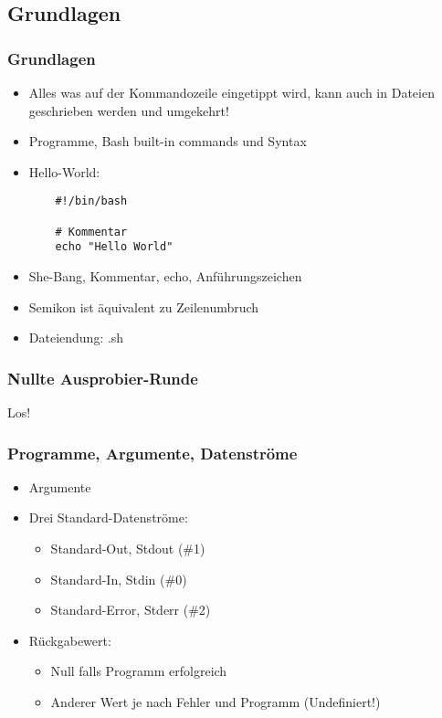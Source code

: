 \documentclass{beamer}
\begin{document}
\subsection{Grundlagen}
\begin{frame}[fragile,label=code]
 \frametitle{Grundlagen}
 
 \begin{itemize}
  \item Alles was auf der Kommandozeile eingetippt wird, kann auch in Dateien geschrieben werden und umgekehrt!
  \item Programme, Bash built-in commands und Syntax
  \item Hello-World:
  \begin{lstlisting}
    #!/bin/bash
    
    # Kommentar
    echo "Hello World"
  \end{lstlisting}
  \item She-Bang, Kommentar, echo, Anführungszeichen
  \item Semikon ist äquivalent zu Zeilenumbruch
  \item Dateiendung: .sh
 \end{itemize}
\end{frame}

\begin{frame}
 \frametitle{Nullte Ausprobier-Runde}
 \begin{center}
 Los!
 \end{center}
\end{frame}

\begin{frame}[fragile]
 \frametitle{Programme, Argumente, Datenströme}
 
  
 \begin{itemize}[<+->]
  \item Argumente
  \item Drei Standard-Datenströme:
   \begin{itemize}[<+->]
     \item Standard-Out, Stdout (\#1)
     \item Standard-In, Stdin (\#0)
     \item Standard-Error, Stderr (\#2)
   \end{itemize}
 \item Rückgabewert:
   \begin{itemize}
       \item Null falls Programm erfolgreich
       \item Anderer Wert je nach Fehler und Programm (Undefiniert!)
   \end{itemize}
 \end{itemize}
\end{frame}
\end{document}
